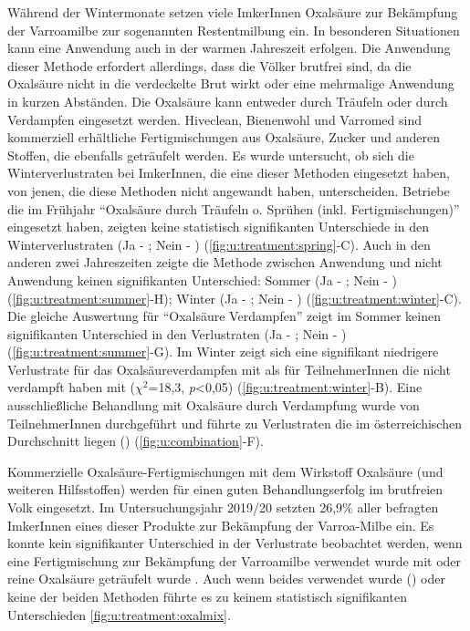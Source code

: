 Während der Wintermonate setzen viele ImkerInnen Oxalsäure zur Bekämpfung der Varroamilbe zur sogenannten Restentmilbung ein. In besonderen Situationen kann eine Anwendung auch in der warmen Jahreszeit erfolgen. Die Anwendung dieser Methode erfordert allerdings, dass die Völker brutfrei sind, da die Oxalsäure nicht in die verdeckelte Brut wirkt oder eine mehrmalige Anwendung in kurzen Abständen.
\newline
Die Oxalsäure kann entweder durch Träufeln oder durch Verdampfen eingesetzt werden. Hiveclean, Bienenwohl und Varromed sind
kommerziell erhältliche Fertigmischungen aus Oxalsäure, Zucker und anderen Stoffen, die ebenfalls geträufelt werden. Es wurde untersucht, ob sich die Winterverlustraten bei ImkerInnen, die eine dieser Methoden eingesetzt haben, von jenen, die diese Methoden nicht angewandt haben, unterscheiden.
\newline
Betriebe die im Frühjahr \enquote{Oxalsäure durch Träufeln o. Sprühen (inkl. Fertigmischungen)} eingesetzt haben, zeigten keine statistisch signifikanten Unterschiede in den Winterverlustraten (Ja - ; Nein - ) (\cref{fig:u:treatment:spring}-C). Auch in den anderen zwei Jahreszeiten zeigte die Methode zwischen Anwendung und nicht Anwendung keinen signifikanten Unterschied: Sommer (Ja - ; Nein - ) (\cref{fig:u:treatment:summer}-H); Winter (Ja - ; Nein - ) (\cref{fig:u:treatment:winter}-C).
\newline
Die gleiche Auswertung für \enquote{Oxalsäure Verdampfen} zeigt im Sommer keinen signifikanten Unterschied in den Verlustraten (Ja - ; Nein - ) (\cref{fig:u:treatment:summer}-G). Im Winter zeigt sich eine signifikant niedrigere Verlustrate für das Oxalsäureverdampfen mit  als für TeilnehmerInnen die nicht verdampft haben mit  ($\chi^{2}$=18,3, \textit{p}<0,05) (\cref{fig:u:treatment:winter}-B). Eine ausschließliche Behandlung mit Oxalsäure durch Verdampfung wurde von  TeilnehmerInnen durchgeführt und führte zu Verlustraten die im österreichischen Durchschnitt liegen () (\cref{fig:u:combination}-F).

\label{sss:mischungox:u}

Kommerzielle Oxalsäure-Fertigmischungen mit dem Wirkstoff Oxalsäure (und weiteren Hilfsstoffen) werden für einen guten Behandlungserfolg im brutfreien Volk eingesetzt. Im Untersuchungsjahr 2019/20 setzten 26,9\% aller befragten ImkerInnen eines dieser Produkte zur Bekämpfung der Varroa-Milbe ein. Es konnte kein signifikanter Unterschied in der Verlustrate beobachtet werden, wenn eine Fertigmischung zur Bekämpfung der Varroamilbe verwendet wurde mit  oder reine Oxalsäure geträufelt wurde .
Auch wenn beides verwendet wurde () oder keine der beiden Methoden  führte es zu keinem statistisch signifikanten Unterschieden \cref{fig:u:treatment:oxalmix}.

